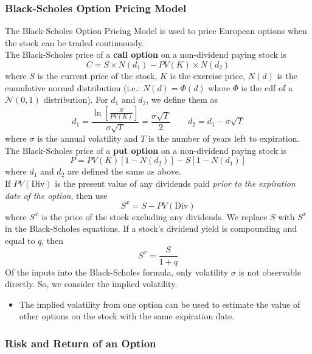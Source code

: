 \documentclass[11pt]{article}
\theoremstyle{definition}
\begin{document}
\subsubsection{Black-Scholes Option Pricing Model}
The Black-Scholes Option Pricing Model is used to price European options when the stock can be traded continuously. \\
The Black-Scholes price of a \textbf{call option} on a non-dividend paying stock is 
\begin{equation*}
    C = S \times N(d_1)  - PV(K) \times N(d_2)
\end{equation*}
where $S$ is the current price of the stock, $K$ is the exercise price, $N(d)$ is the cumulative normal distribution (i.e.: $N(d) = \Phi(d)$ where $\Phi$ is the cdf of a $\mathcal N(0, 1) $ distribution). For $d_1$ and $d_2$, we define them as 
\begin{equation*}
    d_1 = \frac{\ln\left[\frac{S}{PV(K)}\right]}{\sigma\sqrt T} = \frac{\sigma\sqrt{T}}{2} \qquad d_2 = d_1 - \sigma\sqrt{T}
\end{equation*}
where $\sigma$ is the annual volatility and $T$ is the number of years left to expiration.\\
The Black-Scholes price of a \textbf{put option} on a non-dividend paying stock is 
\begin{equation*}
    P = PV(K)[1 - N(d_2)] - S[1 - N(d_1)]
\end{equation*}
where $d_1$ and $d_2$ are defined the same as above. \\
If $PV(\text{Div})$ is the present value of any dividends paid \textit{prior to the expiration date of the option}, then use 
\begin{equation*}
    S^x = S - PV(\text{Div})
\end{equation*}
where $S^x$ is the price of the stock excluding any dividends. We replace $S$ with $S^x$ in the Black-Scholes equations. If a stock's dividend yield is compounding and equal to $q$, then 
\begin{equation*}
    S^x = \frac{S}{1 + q}
\end{equation*}
Of the inputs into the Black-Scholes formula, only volatility $\sigma$ is not observable directly. So, we consider the implied volatility.
\begin{itemize}
    \item The implied volatility from one option can be used to estimate the value of other options on the stock with the same expiration date.
\end{itemize}


\subsubsection{Risk and Return of an Option}
\end{document}

